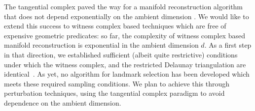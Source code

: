 %
The tangential complex paved the way for a manifold reconstruction
algorithm that does not depend exponentially on the ambient dimension
\cite{geometrica-7142i}.
We would like to extend this success to witness complex based
techniques which are free of expensive geometric predicates:
%
so far, the complexity of witness complex
based manifold reconstruction is exponential in the ambient dimension
$d$.
As a first step in that direction, we established sufficient (albeit
quite restrictive) conditions under which the witness complex, and the
restricted Delaunay triangulation are
identical~\cite{boissonnat2011cgl}.
%
As yet, no algorithm for landmark selection has been developed which
meets these required sampling conditions.  We plan to achieve this
through perturbation techniques, using the tangential complex paradigm
to avoid dependence on the ambient dimension.



